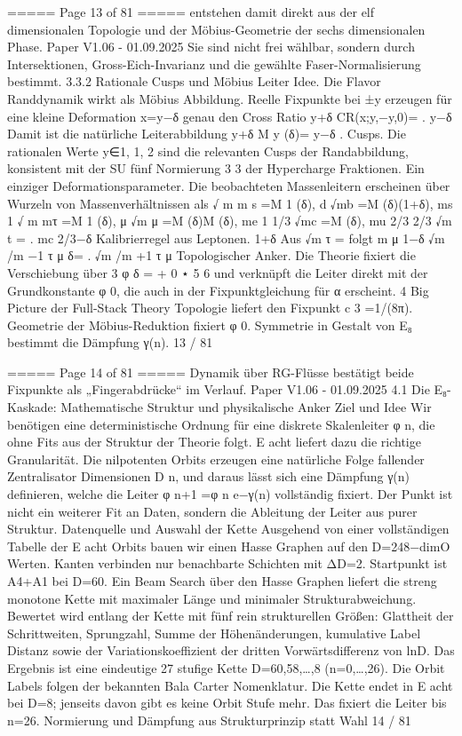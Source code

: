 \begin{MyVerbatim}
===== Page 13 of 81 =====
entstehen damit direkt aus der elf dimensionalen Topologie und der Möbius-Geometrie der sechs dimensionalen Phase.
Paper V1.06 - 01.09.2025
Sie sind nicht frei wählbar, sondern durch Intersektionen, Gross-Eich-Invarianz und die gewählte Faser-Normalisierung
bestimmt.
3.3.2 Rationale Cusps und Möbius Leiter
Idee.
Die Flavor Randdynamik wirkt als Möbius Abbildung. Reelle Fixpunkte bei ±y erzeugen für eine kleine Deformation
x=y−δ genau den Cross Ratio
y+δ
CR(x;y,−y,0)= .
y−δ
Damit ist die natürliche Leiterabbildung
y+δ
M y (δ)= y−δ .
Cusps.
Die rationalen Werte y∈{1, 1, 2} sind die relevanten Cusps der Randabbildung, konsistent mit der SU fünf Normierung
3 3
der Hypercharge Fraktionen.
Ein einziger Deformationsparameter.
Die beobachteten Massenleitern erscheinen über Wurzeln von Massenverhältnissen als
√ m m s =M 1 (δ),
d
√mb =M (δ)(1+δ),
ms 1
√
m
mτ =M
1
(δ),
μ
√m μ =M (δ)M (δ),
me 1 1/3
√mc =M (δ),
mu 2/3
2/3
√m t = .
mc 2/3−δ
Kalibrierregel aus Leptonen.
1+δ
Aus √m τ = folgt
m μ 1−δ
√m /m −1
τ μ
δ= .
√m /m +1
τ μ
Topologischer Anker.
Die Theorie fixiert die Verschiebung über
3 φ
δ = + 0
⋆ 5 6
und verknüpft die Leiter direkt mit der Grundkonstante φ 0, die auch in der Fixpunktgleichung für α erscheint.
4 Big Picture der Full-Stack Theory
Topologie liefert den Fixpunkt c 3 =1/(8π).
Geometrie der Möbius-Reduktion fixiert φ 0.
Symmetrie in Gestalt von E₈ bestimmt die Dämpfung γ(n).
13 / 81

===== Page 14 of 81 =====
Dynamik über RG-Flüsse bestätigt beide Fixpunkte als „Fingerabdrücke“ im Verlauf.
Paper V1.06 - 01.09.2025
4.1 Die E₈-Kaskade: Mathematische Struktur und physikalische Anker
Ziel und Idee
Wir benötigen eine deterministische Ordnung für eine diskrete Skalenleiter φ n, die ohne Fits aus der Struktur der Theorie
folgt. E acht liefert dazu die richtige Granularität. Die nilpotenten Orbits erzeugen eine natürliche Folge fallender
Zentralisator Dimensionen D n, und daraus lässt sich eine Dämpfung γ(n) definieren, welche die Leiter φ n+1 =φ n e−γ(n)
vollständig fixiert. Der Punkt ist nicht ein weiterer Fit an Daten, sondern die Ableitung der Leiter aus purer Struktur.
Datenquelle und Auswahl der Kette
Ausgehend von einer vollständigen Tabelle der E acht Orbits bauen wir einen Hasse Graphen auf den D=248−dimO
Werten. Kanten verbinden nur benachbarte Schichten mit ΔD=2. Startpunkt ist A4+A1 bei D=60. Ein Beam Search
über den Hasse Graphen liefert die streng monotone Kette mit maximaler Länge und minimaler Strukturabweichung.
Bewertet wird entlang der Kette mit fünf rein strukturellen Größen: Glattheit der Schrittweiten, Sprungzahl, Summe der
Höhenänderungen, kumulative Label Distanz sowie der Variationskoeffizient der dritten Vorwärtsdifferenz von lnD.
Das Ergebnis ist eine eindeutige 27 stufige Kette
D=60,58,…,8 (n=0,…,26).
Die Orbit Labels folgen der bekannten Bala Carter Nomenklatur. Die Kette endet in E acht bei D=8; jenseits davon gibt
es keine Orbit Stufe mehr. Das fixiert die Leiter bis n=26.
Normierung und Dämpfung aus Strukturprinzip statt Wahl
14 / 81


\end{MyVerbatim}
